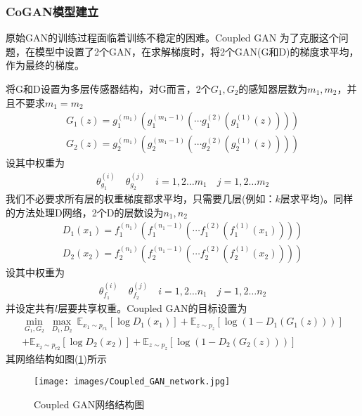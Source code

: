         \subsubsection{CoGAN模型建立}
            \par
            原始GAN的训练过程面临着训练不稳定的困难。Coupled GAN 为了克服这个问题，在模型中设置了2个GAN，在求解梯度时，将2个GAN(G和D)的梯度求平均，作为最终的梯度。
            \par
            将G和D设置为多层传感器结构，对G而言，2个$G_1,G_2$的感知器层数为$m_1,m_2$，并且不要求$m_1 = m_2$
            \begin{align*}
            G_1(z) = g_1^{(m_1)}(g_1^{(m_1-1)}(\cdots g_1^{(2)}(g_1^{(1)}(z))))\\
            G_2(z) = g_2^{(m_1)}(g_2^{(m_1-1)}(\cdots g_2^{(2)}(g_2^{(1)}(z))))
            \end{align*}
            设其中权重为
            \begin{align*}
            \theta_{g_1}^{(i)}\quad \theta_{g_2}^{(j)} \quad i=1,2\dots m_1\quad j=1,2\dots m_2
            \end{align*}
            我们不必要求所有层的权重梯度都求平均，只需要几层(例如：$k$层求平均)。同样的方法处理D网络，2个D的层数设为$n_1,n_2$
            \begin{align*}
            D_1(x_1) = f_1^{(n_1)}(f_1^{(n_1-1)}(\cdots f_1^{(2)}(f_1^{(1)}(x_1))))\\
            D_2(x_2) = f_2^{(n_1)}(f_2^{(n_1-1)}(\cdots f_2^{(2)}(f_2^{(1)}(x_2))))
            \end{align*}
            设其中权重为
            \begin{align*}
            \theta_{f_1}^{(i)}\quad \theta_{f_2}^{(j)} \quad i=1,2\dots n_1\quad j=1,2\dots n_2
            \end{align*}
            并设定共有$l$层要共享权重。Coupled GAN的目标设置为
            \begin{align*}
            \min_{G_1,G_2}\ \max_{D_1,D_2} \ \mathbb{E}_{x_1\sim p_{r1}} [\log D_1(x_1)] + \mathbb{E}_{z\sim p_z}[\log (1-D_1(G_1(z)))] \\
            +\mathbb{E}_{x_2\sim p_{r2}} [\log D_2(x_2)] + \mathbb{E}_{z\sim p_z}[\log (1-D_2(G_2(z)))]
            \end{align*}
            其网络结构如图(\ref{fig:Coupled GAN网络结构图})所示
                \begin{figure}[H]
                \centering
                \texttt{[image: images/Coupled\_GAN\_network.jpg]}
                \caption{Coupled GAN网络结构图}
                \label{fig:Coupled GAN网络结构图}
                \end{figure}
